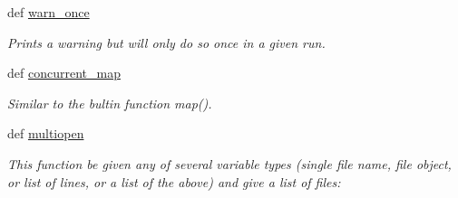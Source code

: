 \begin{DoxyCompactItemize}
\item 
def \hyperlink{namespaceforcebalance_1_1nifty_a26e563ec71ed229c30f3d61d3448c8f1}{warn\-\_\-once}
\begin{DoxyCompactList}\small\item\em Prints a warning but will only do so once in a given run. \end{DoxyCompactList}\item 
def \hyperlink{namespaceforcebalance_1_1nifty_a2fc81730e7efa7d138dd86f733507bfc}{concurrent\-\_\-map}
\begin{DoxyCompactList}\small\item\em Similar to the bultin function map(). \end{DoxyCompactList}\item 
def \hyperlink{namespaceforcebalance_1_1nifty_a64b7c6ca7afa1c11681f5c2897c55cc3}{multiopen}
\begin{DoxyCompactList}\small\item\em This function be given any of several variable types (single file name, file object, or list of lines, or a list of the above) and give a list of files\-: \end{DoxyCompactList}\end{DoxyCompactItemize}

